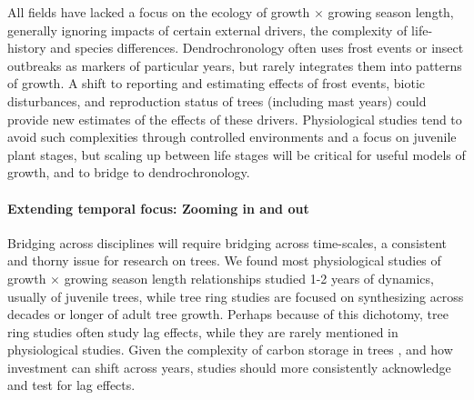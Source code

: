 \documentclass[11pt]{article}
\begin{document}
All fields have lacked a focus on the ecology of growth $\times$ growing season length, generally ignoring impacts of certain external drivers, the complexity of life-history and species differences. Dendrochronology often uses frost events or insect outbreaks as markers of particular years, but rarely integrates them into patterns of growth. A shift to reporting and estimating effects of frost events, biotic disturbances, and reproduction status of trees (including mast years) could provide new estimates of the effects of these drivers. Physiological studies tend to avoid such complexities through controlled environments and a focus on juvenile plant stages, but scaling up between life stages will be critical for useful models of growth, and to bridge to dendrochronology. %

\paragraph{Extending temporal focus: Zooming in and out}%

Bridging across disciplines will require bridging across time-scales, a consistent and thorny issue for research on trees. We found most physiological studies of growth $\times$ growing season length relationships studied 1-2 years of dynamics, usually of juvenile trees, while tree ring studies are focused on synthesizing across decades or longer of adult tree growth. Perhaps because of this dichotomy, tree ring studies often study lag effects, while they are rarely mentioned in physiological studies. Given the complexity of carbon storage in trees \citep{finzi2020,thompson2023no,anderson2022drives}, and how investment can shift across years, studies should more consistently acknowledge and test for lag effects. %
\end{document}
